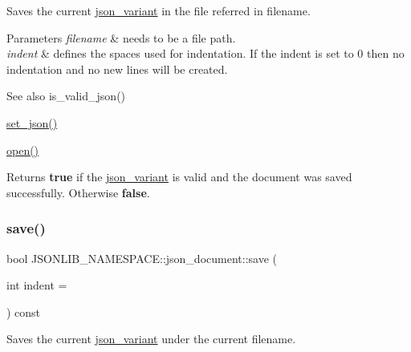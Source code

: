 Saves the current \hyperlink{classJSONLIB__NAMESPACE_1_1json__variant}{json\+\_\+variant} in the file referred in {\ttfamily filename}. 


\begin{DoxyParams}{Parameters}
{\em filename} & needs to be a file path. \\
\hline
{\em indent} & defines the spaces used for indentation. If the indent is set to 0 then no indentation and no new lines will be created. \\
\hline
\end{DoxyParams}
\begin{DoxySeeAlso}{See also}
is\+\_\+valid\+\_\+json() 

\hyperlink{classJSONLIB__NAMESPACE_1_1json__document_a5a72e4dc0b37b95c70baefad930b5b71}{set\+\_\+json()} 

\hyperlink{classJSONLIB__NAMESPACE_1_1json__document_a08e509059e628742f35716dddce2d740}{open()} 
\end{DoxySeeAlso}
\begin{DoxyReturn}{Returns}
{\bfseries true} if the \hyperlink{classJSONLIB__NAMESPACE_1_1json__variant}{json\+\_\+variant} is valid and the document was saved successfully. Otherwise {\bfseries false}. 
\end{DoxyReturn}
\mbox{\label{classJSONLIB__NAMESPACE_1_1json__document_a861865e1aae02c2de80eb60a4a8bd668}} 
\subsubsection{\texorpdfstring{save()}{save()}\hspace{0.1cm}{\footnotesize\ttfamily [6/6]}}
{\footnotesize\ttfamily bool J\+S\+O\+N\+L\+I\+B\+\_\+\+N\+A\+M\+E\+S\+P\+A\+C\+E\+::json\+\_\+document\+::save (\begin{DoxyParamCaption}\item[{int}]{indent = {} }\end{DoxyParamCaption}) const}



Saves the current \hyperlink{classJSONLIB__NAMESPACE_1_1json__variant}{json\+\_\+variant} under the current filename. 


